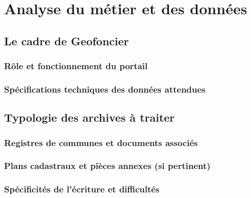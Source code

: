 \chapter{Analyse du métier et des données}

\section{Le cadre de Geofoncier}
\subsection{Rôle et fonctionnement du portail}

\subsection{Spécifications techniques des données attendues}

\section{Typologie des archives à traiter}
\subsection{Registres de communes et documents associés}

\subsection{Plans cadastraux et pièces annexes (si pertinent)}

\subsection{Spécificités de l'écriture et difficultés}

